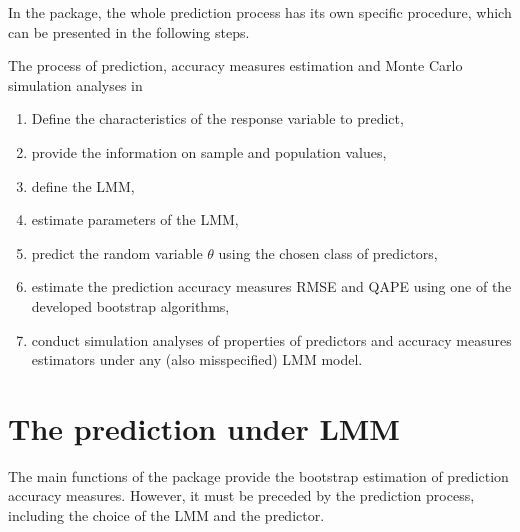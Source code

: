In the  package, the whole prediction process has its own specific procedure, which can be presented in the following steps.

\begin{procedure} The process of prediction, accuracy measures estimation and Monte Carlo simulation analyses in 
\label{Proc1}
\begin{enumerate}
    \item  Define the characteristics of the response variable to predict,
    \item  provide the information on sample and population values,
    \item  define the LMM,
    \item  estimate parameters of the LMM,
    \item  predict the random variable $\theta$ using the chosen class of predictors,
    \item  estimate the prediction accuracy measures RMSE and QAPE using one of the developed bootstrap algorithms,
    \item  conduct simulation analyses of properties of predictors and accuracy measures estimators under any (also misspecified) LMM model.
\end{enumerate}
\end{procedure}

\section{The prediction under LMM}

The main functions of the  package provide the bootstrap estimation of prediction accuracy measures. However, it must be preceded by the prediction process, including the choice of the LMM and the predictor.


